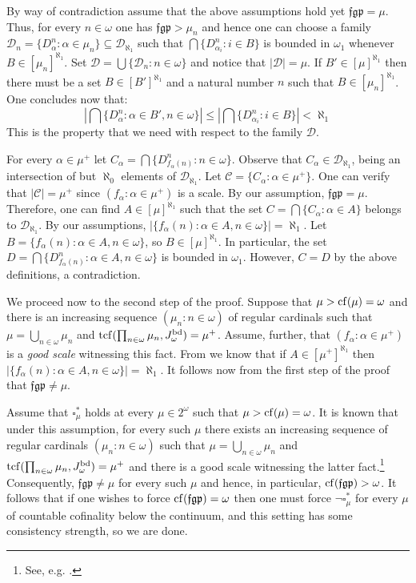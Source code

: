 \documentclass[11pt]{amsart}
\theoremstyle{definition}
\theoremstyle{remark}
\newcommand{\cf}{{\rm cf}}
\begin{document}
By way of contradiction assume that the above assumptions hold yet $\mathfrak{fgp}=\mu$.
Thus, for every $n\in\omega$ one has $\mathfrak{fgp}>\mu_n$ and hence one can choose a family $\mathcal{D}_n=\{D^n_\alpha:\alpha\in\mu_n\}\subseteq\mathscr{D}_{\aleph_1}$ such that $\bigcap\{D^n_{\alpha_i}:i\in{B}\}$ is bounded in $\omega_1$ whenever $B\in[\mu_n]^{\aleph_1}$.
Set $\mathcal{D}=\bigcup\{\mathcal{D}_n:n\in\omega\}$ and notice that $|\mathcal{D}|=\mu$.
If $B'\in[\mu]^{\aleph_1}$ then there must be a set $B\in[B']^{\aleph_1}$ and a natural number $n$ such that $B\in[\mu_n]^{\aleph_1}$.
One concludes now that:
\[|\bigcap\{D^n_{\alpha}:\alpha\in{B'},n\in\omega\}|\leq|\bigcap\{D^n_{\alpha_i}:i\in{B}\}|<\aleph_1\]
This is the property that we need with respect to the family $\mathcal{D}$.

For every $\alpha\in\mu^+$ let $C_\alpha=\bigcap\{D^n_{f_\alpha(n)}:n\in\omega\}$.
Observe that $C_\alpha\in\mathscr{D}_{\aleph_1}$, being an intersection of but $\aleph_0$ elements of $\mathscr{D}_{\aleph_1}$.
Let $\mathcal{C}=\{C_\alpha:\alpha\in\mu^+\}$.
One can verify that $|\mathcal{C}|=\mu^+$ since $(f_\alpha:\alpha\in\mu^+)$ is a scale.
By our assumption, $\mathfrak{fgp}=\mu$.
Therefore, one can find $A\in[\mu]^{\aleph_1}$ such that the set $C=\bigcap\{C_\alpha:\alpha\in{A}\}$ belongs to $\mathscr{D}_{\aleph_1}$.
By our assumptions, $|\{f_\alpha(n):\alpha\in{A}, n\in\omega\}|=\aleph_1$.
Let $B=\{f_\alpha(n):\alpha\in{A},n\in\omega\}$, so $B\in[\mu]^{\aleph_1}$.
In particular, the set $D=\bigcap\{D^n_{f_\alpha(n)}:\alpha\in{A},n\in\omega\}$ is bounded in $\omega_1$.
However, $C=D$ by the above definitions, a contradiction.

We proceed now to the second step of the proof.
Suppose that $\mu>\cf(\mu)=\omega$ and there is an increasing sequence $(\mu_n:n\in\omega)$ of regular cardinals such that $\mu=\bigcup_{n\in\omega}\mu_n$ and ${\rm tcf}(\prod_{n\in\omega}\mu_n,J^{\rm bd}_\omega)=\mu^+$.
Assume, further, that $(f_\alpha:\alpha\in\mu^+)$ is a \emph{good scale} witnessing this fact.
From \cite[Theorem 1.4]{MR4423479} we know that if $A\in[\mu^+]^{\aleph_1}$ then $|\{f_\alpha(n):\alpha\in{A},n\in\omega\}|=\aleph_1$.
It follows now from the first step of the proof that $\mathfrak{fgp}\neq\mu$.

Assume that $\square^*_\mu$ holds at every $\mu\in{2^\omega}$ such that $\mu>\cf(\mu)=\omega$.
It is known that under this assumption, for every such $\mu$ there exists an increasing sequence of regular cardinals $(\mu_n:n\in\omega)$ such that $\mu=\bigcup_{n\in\omega}\mu_n$ and ${\rm tcf}(\prod_{n\in\omega}\mu_n,J^{\rm bd}_\omega)=\mu^+$ and there is a good scale witnessing the latter fact.\footnote{See, e.g. \cite[Section 15]{MR2160657}.}
Consequently, $\mathfrak{fgp}\neq\mu$ for every such $\mu$ and hence, in particular, $\cf(\mathfrak{fgp})>\omega$.
It follows that if one wishes to force $\cf(\mathfrak{fgp})=\omega$ then one must force $\neg\square^*_\mu$ for every $\mu$ of countable cofinality below the continuum, and this setting has some consistency strength, so we are done.
\end{document}
